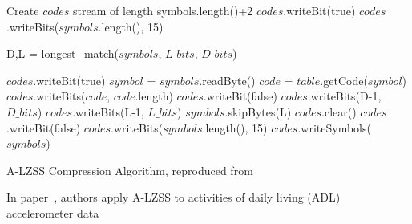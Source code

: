 \begin{algorithm}
\begin{algorithmic}[1]
\Input
\EndInput
\Output
\EndOutput

\State Create $codes$ stream of length symbols.length()+2   
\State $codes$.writeBit(true)   
\State $codes$.writeBits($symbols$.length(), 15)    

   
    \State D,L = longest\_match($symbols$, $L\_bits$, $D\_bits$) 
    
      
        \State $codes$.writeBit(true)   
        \State $symbol$ = $symbols$.readByte()  
        \State $code$ = $table$.getCode($symbol$)   
        \State $codes$.writeBits($code$, $code$.length)
    \Else   {}
        \State $codes$.writeBit(false)  
        \State $codes$.writeBits(D-1, $D\_bits$)    
        \State $codes$.writeBits(L-1, $L\_bits$)
        \State $symbols$.skipBytes(L)   
    \EndIf
\EndWhile
{}  
    \State $codes$.clear()
    \State $codes$.writeBit(false)
    \State $codes$.writeBits($symbols$.length(), 15)
    \State $codes$.writeSymbols($symbols$) 
\EndIf
\end{algorithmic}
\caption{A-LZSS Compression Algorithm, reproduced from~\cite{pope2018accelerometer}}
\label{algo:A-LZSS}
\end{algorithm}

In paper~\cite{pope2018accelerometer}, authors apply A-LZSS to activities of daily living (ADL)~\cite{jackson1963studies} accelerometer data 

